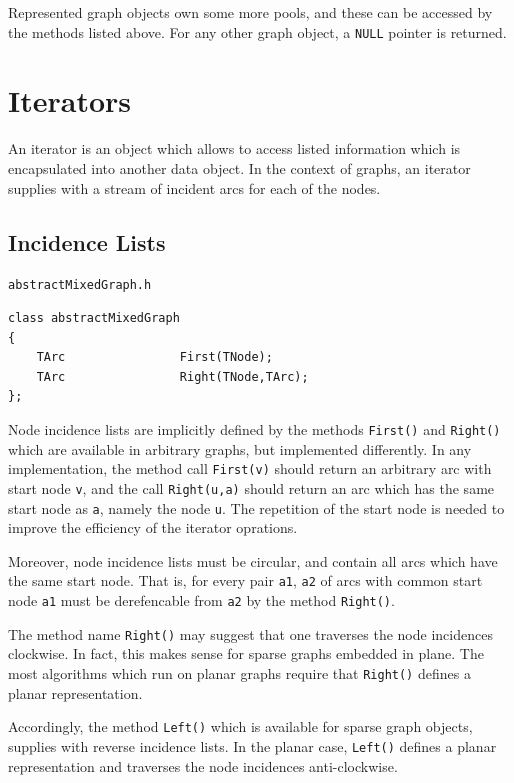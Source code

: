 \documentclass[a4paper,11pt,twoside]{book}
\begin{document}
\begin{multicols}{2}
Represented graph objects own some more pools, and these can be accessed by the
methods listed above. For any other graph object, a \verb/NULL/ pointer is
returned.



\cleardoublepage
{}
\chapter{Iterators}
\thispagestyle{fancy}
\label{clb_it}

An iterator is an object which allows to access listed information which is
encapsulated into another data object. In the context of graphs, an iterator
supplies with a stream of incident arcs for each of the nodes.


\section{Incidence Lists}
\label{slb_inci}
\myinclude\verb/abstractMixedGraph.h/
\begin{mymethods}
\begin{verbatim}
class abstractMixedGraph
{
    TArc                First(TNode);
    TArc                Right(TNode,TArc);
};
\end{verbatim}
\end{mymethods}
Node incidence lists are implicitly defined by the methods \verb/First()/ and
\verb/Right()/ which are available in arbitrary graphs, but implemented
differently. In any implementation, the method call \verb/First(v)/ should
return an arbitrary arc with start node \verb/v/, and the call \verb/Right(u,a)/
should return an arc which has the same start node as \verb/a/, namely the node
\verb/u/. The repetition of the start node is needed to improve the efficiency
of the iterator oprations.

Moreover, node incidence lists must be circular, and contain all arcs which
have the same start node. That is, for every pair \verb/a1/, \verb/a2/
of arcs with common start node \verb/a1/ must be derefencable from \verb/a2/
by the method \verb/Right()/.

The method name \verb/Right()/ may suggest that one traverses the node incidences
clockwise. In fact, this makes sense for sparse graphs embedded in plane.
The most algorithms which run on planar graphs require that \verb/Right()/
defines a planar representation.

Accordingly, the method \verb/Left()/ which is available for sparse graph objects,
supplies with reverse incidence lists. In the planar case, \verb/Left()/
defines a planar representation and traverses the node incidences anti-clockwise.




\end{multicols}
\end{document}
